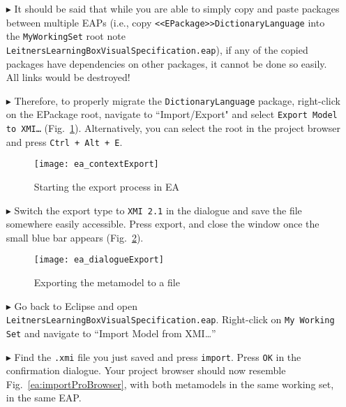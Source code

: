 \begin{itemize}
\item[$\blacktriangleright$] It should be said that while you are able to simply copy and paste packages between multiple EAPs (i.e., copy
\texttt{<<E\-Pack\-age>>Dict\-ion\-ary\-Lang\-uage} into the \texttt{MyWorkingSet} root note \texttt{LeitnersLearningBoxVisualSpecification.eap}), if any of the copied packages
have dependencies on other packages, it cannot be done so easily. All links would be destroyed! 

\clearpage

\item[$\blacktriangleright$] Therefore, to properly migrate the \texttt{DictionaryLanguage} package, right-click on the EPackage root, navigate to
``Import/Export" and select \texttt{Export Model to XMI\ldots} (Fig.~\ref{ea:contextExport}). Alternatively, you can select the root in the project browser and
press \texttt{Ctrl + Alt + E}.

\vspace{0.5cm}

\begin{figure}[htbp]
\begin{center}
  \texttt{[image: ea\_contextExport]}
  \caption{Starting the export process in EA}
  \label{ea:contextExport}
\end{center}
\end{figure}

\item[$\blacktriangleright$] Switch the export type to \texttt{XMI 2.1} in the dialogue and save the file somewhere easily accessible. Press export, and close
the window once the small blue bar appears (Fig.~\ref{ea:export}).

\begin{figure}[htbp]
\begin{center}
  \texttt{[image: ea\_dialogueExport]}
  \caption{Exporting the metamodel to a file}
  \label{ea:export}
\end{center}
\end{figure}

\item[$\blacktriangleright$] Go back to Eclipse and open \texttt{LeitnersLearningBoxVisualSpecification.eap}. Right-click on \texttt{My Working Set} and navigate to ``Import
Model from XMI\ldots''

\item[$\blacktriangleright$] Find the \texttt{.xmi} file you just saved and
press \texttt{import}. Press \texttt{OK} in the confirmation dialogue. Your project browser should now resemble Fig.~\ref{ea:importProBrowser}, with both metamodels in the same working set, in the same EAP.


\end{itemize}
